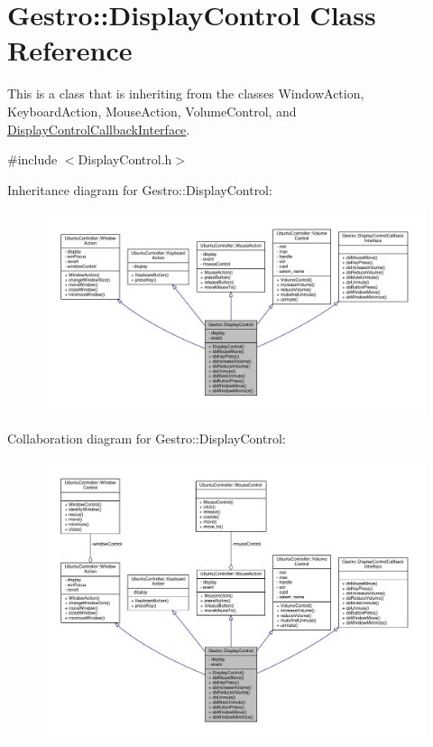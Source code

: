 \hypertarget{class_gestro_1_1_display_control}{}\section{Gestro\+:\+:Display\+Control Class Reference}
\label{class_gestro_1_1_display_control}


This is a class that is inheriting from the classes Window\+Action, Keyboard\+Action, Mouse\+Action, Volume\+Control, and \hyperlink{class_gestro_1_1_display_control_callback_interface}{Display\+Control\+Callback\+Interface}.  




{\ttfamily \#include $<$Display\+Control.\+h$>$}



Inheritance diagram for Gestro\+:\+:Display\+Control\+:
\nopagebreak
\begin{figure}[H]
\begin{center}
\leavevmode
\includegraphics[width=350pt]{class_gestro_1_1_display_control__inherit__graph}
\end{center}
\end{figure}


Collaboration diagram for Gestro\+:\+:Display\+Control\+:
\nopagebreak
\begin{figure}[H]
\begin{center}
\leavevmode
\includegraphics[width=350pt]{class_gestro_1_1_display_control__coll__graph}
\end{center}
\end{figure}

